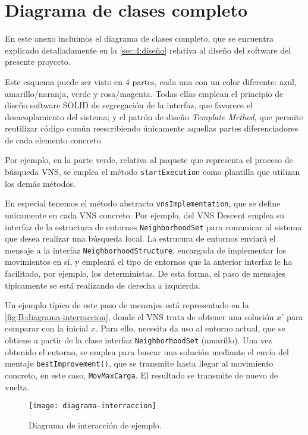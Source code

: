 \graphicspath{{anexos/AnexoB-Diagrama-Clases-Completo/recursos/}}

\section{Diagrama de clases completo} \label{Anexo:diagrama-clases}

En este anexo incluimos el diagrama de clases completo, que se encuentra explicado detalladamente en la \autoref{sec:4:diseño} relativa al diseño del software del presente proyecto.

Este esquema puede ser visto en 4 partes, cada una con un color diferente: azul, amarillo/naranja, verde y rosa/magenta. Todas ellas emplean el principio de diseño software SOLID de segregación de la interfaz, que favorece el desacoplamiento del sistema; y el patrón de diseño \textit{Template Method}, que permite reutilizar código común reescribiendo únicamente aquellas partes diferenciadores de cada elemento concreto.

Por ejemplo, en la parte verde, relativa al paquete que representa el proceso de búsqueda VNS, se emplea el método \texttt{startExecution} como plantilla que utilizan los demás métodos. 

En especial tenemos el método abstracto \texttt{vnsImplementation}, que se define unicamente en cada VNS concreto. Por ejemplo, del VNS Descent emplea su interfaz de la estructura de entornos \texttt{NeighborhoodSet} para comunicar al sistema que desea realizar una búsqueda local. La estrucura de entornos enviará el mensaje a la interfaz \texttt{NeighborhoodStructure}, encargada de implementar los movimientos en sí, y empleará el tipo de entornos que la anterior interfaz le ha facilitado, por ejemplo, los deterministas. De esta forma, el paso de mensajes típicamente se está realizando de derecha a izquierda. 

Un ejemplo típico de este paso de mensajes está representado en la \autoref{fig:B:diagrama-interraccion}, donde el VNS trata de obtener una solución $x'$ para comparar con la inicial $x$. Para ello, necesita da uso al entorno actual, que se obtiene a partir de la clase interfaz \texttt{NeighborhoodSet} (amarillo). Una vez obtenido el entorno, se emplea para buscar una solución mediante el envío del mentaje \texttt{bestImprovement()}, que se transmite hasta llegar al movimiento concreto, en este caso, \texttt{MovMaxCarga}. El resultado se transmite de nuevo de vuelta.

\begin{figure}[h]
	\centering
	\texttt{[image: diagrama-interraccion]}
	\caption{Diagrama de interacción de ejemplo.}
	\label{fig:B:diagrama-interraccion}
\end{figure}

\begin{landscape}
	
\end{landscape}
